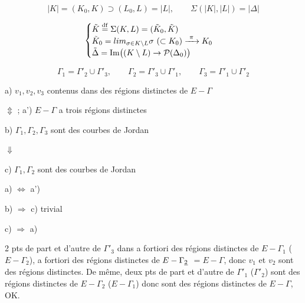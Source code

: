 \documentclass[11pt,a4paper]{article}
\begin{document}
\[
|K| = (K_0, K) \supset (L_0, L) = |L|, \qquad \Sigma(|K|, |L|) = |\Delta|
\]

\[
\begin{cases}
\tilde{K} \overset{\mathrm{df}}{=} \Sigma(K, L) = (\tilde{K}_0, \tilde{K}) \\
\tilde{K}_0 = \varinjlim_{\sigma \in K \setminus L} \sigma \ (\subset K_0) \xrightarrow{\ \pi\ } K_0 \\
\tilde{\Delta} = \operatorname{Im}\bigl((K \setminus L) \to \mathcal{P}(\Delta_0)\bigr)
\end{cases}
\]


\[
\Gamma_1 = \Gamma'_2 \cup \Gamma'_3, \qquad
\Gamma_2 = \Gamma'_3 \cup \Gamma'_1, \qquad
\Gamma_3 = \Gamma'_1 \cup \Gamma'_2
\]

a) $v_1, v_2, v_3$  contenus dans des régions
distinctes de $E - \Gamma$

$\Updownarrow$ ; a') $E - \Gamma$ a trois régions distinctes

b) $\Gamma_1, \Gamma_2, \Gamma_3$ sont des courbes de Jordan

$\Downarrow$

c) $\Gamma_1, \Gamma_2$ sont des courbes de Jordan


a) $\Longleftrightarrow$ a')

b) $\Rightarrow$ c) \struck{$\Longleftrightarrow$} trivial

c) $\Rightarrow$ a)

 2 pts de part et d'autre de $\Gamma'_3$ dans
 \ill{} \ill{} a fortiori
des régions distinctes de $E - \Gamma_1$ ($E - \Gamma_2$), 
a fortiori des régions distinctes de \struck{\ill{}}
$E - \Gamma_{\uncertain{2}}$ $= E - \Gamma$, donc $v_1$ et $v_2$ sont
des régions distinctes. De même, deux pts de part et d'autre de $\Gamma'_1$
($\Gamma'_2$) sont des régions distinctes de $E - \Gamma_2$ ($E - \Gamma_1$)
donc sont des régions distinctes de $E - \Gamma$, OK.
\end{document}
